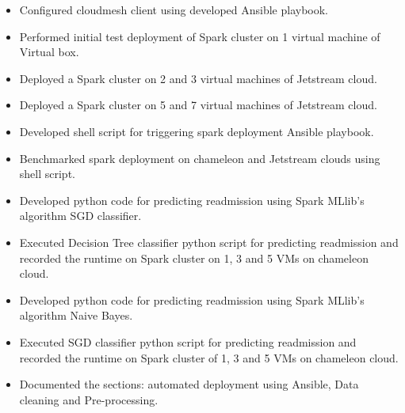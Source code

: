 \documentclass[9pt,twocolumn,twoside]{../../styles/osajnl}
\begin{document}
\begin{appendices}
\begin{itemize}
\begin{itemize}
\item Configured cloudmesh client using developed Ansible playbook.
\item Performed initial test deployment of Spark cluster on 1 virtual machine of Virtual box.
\item Deployed a Spark cluster on 2 and 3 virtual machines of Jetstream cloud.
\item Deployed a Spark cluster  on 5 and 7 virtual machines of Jetstream cloud.
\item Developed shell script for triggering spark deployment Ansible playbook. 
\item Benchmarked spark deployment on chameleon and Jetstream clouds using shell script.
\item Developed python code for predicting readmission using Spark MLlib's algorithm SGD classifier.
\item Executed Decision Tree classifier python script for predicting readmission and recorded the runtime on Spark cluster on 1, 3 and 5 VMs on chameleon cloud.
\item Developed python code for predicting readmission using Spark MLlib's algorithm Naive Bayes.
\item Executed SGD classifier python script for predicting readmission and recorded the runtime on Spark cluster of 1, 3 and 5 VMs  on chameleon cloud.
\item Documented the sections: automated deployment using Ansible, Data cleaning and Pre-processing. 
    \end{itemize}
\end{itemize}
\end{appendices}
\end{document}
